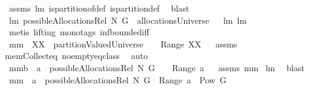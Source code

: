 \begin{isabellebody}
%
\isadelimproof
%
\endisadelimproof
%
\isatagproof
{}\isamarkupfalse%
\ assms\ lm{}{}\ is{\isacharunderscore}partition{\isacharunderscore}of{\isacharunderscore}def\ is{\isacharunderscore}partition{\isacharunderscore}def\ \isamarkupfalse%
\ blast%
\endisatagproof
{\isafoldproof}%
%
\isadelimproof
\isanewline
%
\endisadelimproof
\isanewline
{}\isamarkupfalse%
\ lm{}{}{\isacharcolon}\ {\isachardoublequoteopen}possibleAllocationsRel\ N\ G\ {\isasymsubseteq}\ allocationsUniverse{\isachardoublequoteclose}%
\isadelimproof
\ %
\endisadelimproof
%
\isatagproof
{}\isamarkupfalse%
\ lm{}{}\ lm{}{}\ \isanewline
{}\isamarkupfalse%
\ {\isacharparenleft}metis\ {\isacharparenleft}lifting{\isacharcomma}\ mono{\isacharunderscore}tags{\isacharparenright}\ inf{\isachardot}bounded{\isacharunderscore}iff{\isacharparenright}%
\endisatagproof
{\isafoldproof}%
%
\isadelimproof
%
\endisadelimproof
\isanewline
\isanewline
{}\isamarkupfalse%
\ mm{}{}{\isacharcolon}\ \ {\isachardoublequoteopen}XX\ {\isasymin}\ partitionValuedUniverse{\isachardoublequoteclose}\ \ {\isachardoublequoteopen}{\isacharbraceleft}{\isacharbraceright}\ {\isasymnotin}\ Range\ XX{\isachardoublequoteclose}%
\isadelimproof
\ %
\endisadelimproof
%
\isatagproof
{}\isamarkupfalse%
\ assms\ \isanewline
mem{\isacharunderscore}Collect{\isacharunderscore}eq\ no{\isacharunderscore}empty{\isacharunderscore}eq{\isacharunderscore}class\ \isamarkupfalse%
\ auto%
\endisatagproof
{\isafoldproof}%
%
\isadelimproof
%
\endisadelimproof
\isanewline
{}\isamarkupfalse%
\ mm{}{}b{\isacharcolon}\ \ {\isachardoublequoteopen}a\ {\isasymin}\ possibleAllocationsRel\ N\ G{\isachardoublequoteclose}\ \ {\isachardoublequoteopen}{\isacharbraceleft}{\isacharbraceright}\ {\isasymnotin}\ Range\ a{\isachardoublequoteclose}%
\isadelimproof
\ %
\endisadelimproof
%
\isatagproof
{}\isamarkupfalse%
\ assms\ mm{}{}\ \isanewline
lm{}{}\ \isamarkupfalse%
\ blast%
\endisatagproof
{\isafoldproof}%
%
\isadelimproof
%
\endisadelimproof
\isanewline
{}\isamarkupfalse%
\ mm{}{}{\isacharcolon}\ \ {\isachardoublequoteopen}a\ {\isasymin}\ possibleAllocationsRel\ N\ G{\isachardoublequoteclose}\ \ {\isachardoublequoteopen}Range\ a\ {\isasymsubseteq}\ Pow\ G{\isachardoublequoteclose}\isanewline

\end{isabellebody}
